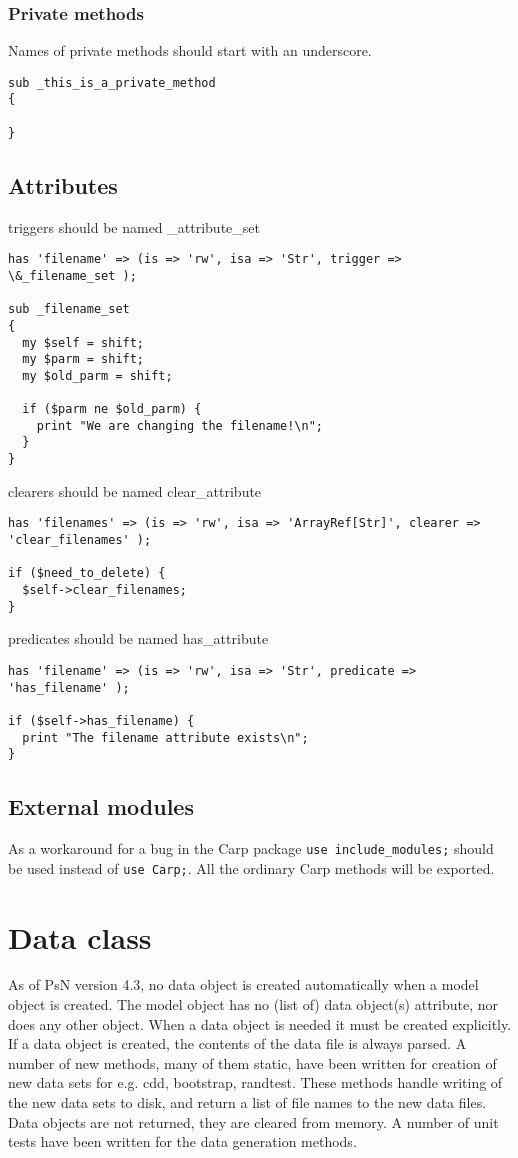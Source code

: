 \subsubsection{Private methods}

Names of private methods should start with an underscore.
\begin{verbatim}
sub _this_is_a_private_method
{

}
\end{verbatim}


\subsection{Attributes}
triggers should be named \_attribute\_set
\begin{verbatim}
has 'filename' => (is => 'rw', isa => 'Str', trigger => \&_filename_set );

sub _filename_set
{
  my $self = shift;
  my $parm = shift;
  my $old_parm = shift;

  if ($parm ne $old_parm) {
    print "We are changing the filename!\n";
  }
}
\end{verbatim}

clearers should be named clear\_attribute
\begin{verbatim}
has 'filenames' => (is => 'rw', isa => 'ArrayRef[Str]', clearer => 'clear_filenames' );

if ($need_to_delete) {
  $self->clear_filenames;
}
\end{verbatim}

predicates should be named has\_attribute
\begin{verbatim}
has 'filename' => (is => 'rw', isa => 'Str', predicate => 'has_filename' );

if ($self->has_filename) {
  print "The filename attribute exists\n";
}
\end{verbatim}

\subsection{External modules}

As a workaround for a bug in the Carp package \verb|use include_modules;| should be used instead of \verb|use Carp;|. All the ordinary Carp methods will be exported.


\section{Data class}
As of PsN version 4.3, no data object is created automatically when a model object is created.
The model object has no (list of) data object(s) attribute, nor does any other object.
When a data object is needed it must be created explicitly. If a data object is created, the contents of the
data file is always parsed. A number of new methods, many of them
static, have been written for creation of new data sets for e.g. cdd, bootstrap, randtest. 
These methods handle writing of the new data sets to disk, and return a list of file names to the
new data files. Data objects are not returned, they are cleared from memory. A number of unit tests have been written for
the data generation methods.

